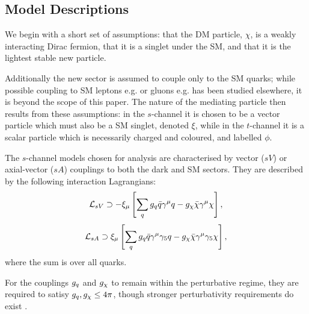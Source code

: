 \subsection{Model Descriptions}
We begin with a short set of assumptions: that the DM particle, $\chi$, is a weakly interacting Dirac fermion, that it is a singlet under the SM, and that it is the lightest stable new particle.

Additionally the new sector is assumed to couple only to the SM quarks; while possible coupling to SM leptons e.g. \cite{Fox:2011fx} or gluons e.g. \cite{SiM_gluons} has been studied elsewhere, it is beyond the scope of this paper. The nature of the mediating particle then results from these assumptions: in the $s$-channel it is chosen to be a vector particle which must also be a SM singlet, denoted $\xi$, while in the $t$-channel it is a scalar particle which is necessarily charged and coloured, and labelled $\phi$.

The $s$-channel models chosen for analysis are characterised by vector ($sV$) or axial-vector ($sA$) couplings to both the dark and SM sectors. They are described by the following interaction Lagrangians:
\begin{equation}
\label{L_int_sV}
\mathcal{L}_{sV} \supset - \xi_{\mu}\left[ \sum\limits_{q} g_q\bar{q}\gamma^{\mu}q - g_{\chi}\bar{\chi}\gamma^{\mu}\chi\right],
\end{equation}
\begin{equation}
\label{L_int_sA}
\mathcal{L}_{sA} \supset  \xi_{\mu}\left[\sum\limits_{q} g_q\bar{q}\gamma^{\mu}\gamma_{5}q - g_{\chi}\bar{\chi}\gamma^{\mu}\gamma_{5}\chi\right],
\end{equation}
where the sum is over all quarks.

For the couplings $g_q$ and $g_{\chi}$ to remain within the perturbative regime, they are required to satisy $g_q,g_{\chi} \leq 4\pi$, though stronger perturbativity requirements do exist \cite{ValidEFT}.

